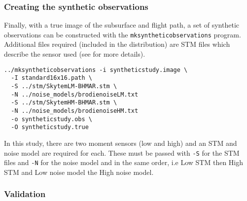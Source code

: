 \documentclass[a4paper,12pt]{article}
\begin{document}
\subsubsection{Creating the synthetic observations}

Finally, with a true image of the subsurface and flight path, a set of
synthetic observations can be constructed with the {\tt mksyntheticobservations}
program. Additional files required (included in the distribution) are STM
files which describe the sensor used (see \citet{GAAEM:2016:A} for more details).

\begin{verbatim}
../mksyntheticobservations -i syntheticstudy.image \
  -I standard16x16.path \
  -S ../stm/SkytemLM-BHMAR.stm \
  -N ../noise_models/brodienoiseLM.txt
  -S ../stm/SkytemHM-BHMAR.stm \
  -N ../noise_models/brodienoiseHM.txt
  -o syntheticstudy.obs \
  -O syntheticstudy.true
\end{verbatim}

In this study, there are two moment sensors (low and high) and an STM
and noise model are required for each. These must be passed with {\tt -S}
for the STM files and {\tt -N} for the noise model and in the same order,
i.e Low STM then High STM and Low noise model the High noise model.

\subsubsection{Validation}


\begin{verbatim}

\end{verbatim}
\end{document}
